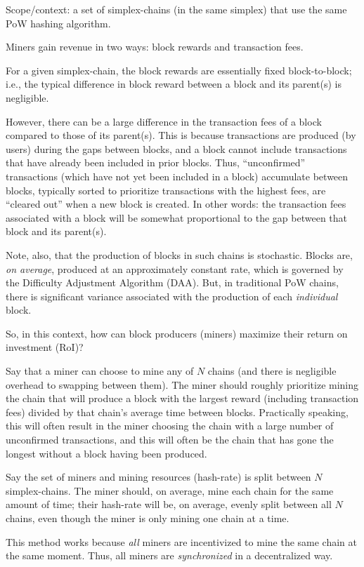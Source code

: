 \documentclass[a4paper,]{article}
\begin{document}
Scope/context: a set of simplex-chains (in the same simplex) that use the same PoW hashing algorithm.

Miners gain revenue in two ways: block rewards and transaction fees.

For a given simplex-chain, the block rewards are essentially fixed block-to-block; i.e., the typical difference in block reward between a block and its parent(s) is negligible.

However, there can be a large difference in the transaction fees of a block compared to those of its parent(s).
This is because transactions are produced (by users) during the gaps between blocks, and a block cannot include transactions that have already been included in prior blocks.
Thus, ``unconfirmed'' transactions (which have not yet been included in a block) accumulate between blocks, typically sorted to prioritize transactions with the highest fees, are ``cleared out'' when a new block is created.
In other words: the transaction fees associated with a block will be somewhat proportional to the gap between that block and its parent(s).

Note, also, that the production of blocks in such chains is stochastic.
Blocks are, \emph{on average}, produced at an approximately constant rate, which is governed by the Difficulty Adjustment Algorithm (DAA).
But, in traditional PoW chains, there is significant variance associated with the production of each \emph{individual} block.

So, in this context, how can block producers (miners) maximize their return on investment (RoI)?

Say that a miner can choose to mine any of $N$ chains (and there is negligible overhead to swapping between them).
The miner should roughly prioritize mining the chain that will produce a block with the largest reward (including transaction fees) divided by that chain's average time between blocks.
Practically speaking, this will often result in the miner choosing the chain with a large number of unconfirmed transactions, and this will often be the chain that has gone the longest without a block having been produced.

Say the set of miners and mining resources (hash-rate) is split between $N$ simplex-chains.
The miner should, on average, mine each chain for the same amount of time; their hash-rate will be, on average, evenly split between all $N$ chains, even though the miner is only mining one chain at a time.

This method works because \emph{all} miners are incentivized to mine the same chain at the same moment.
Thus, all miners are \emph{synchronized} in a decentralized way.
\end{document}
